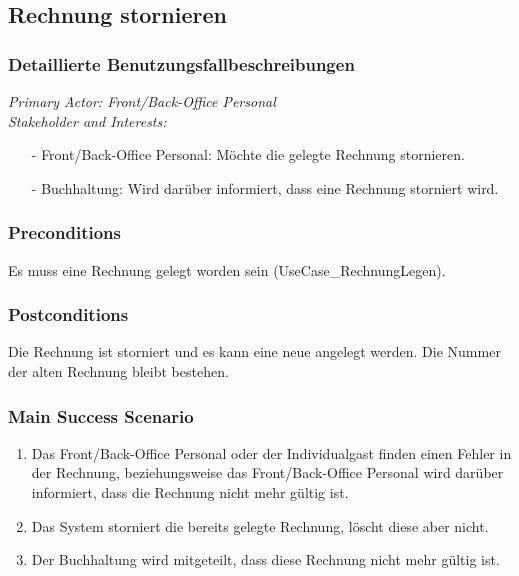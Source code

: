 \documentclass[./detailed_overview_usecases.tex]{subfiles}
\begin{document}
    \subsection{Rechnung stornieren}
    \subsubsection{Detaillierte Benutzungsfallbeschreibungen}
    \textit{Primary Actor: Front/Back-Office Personal}
    \\
    \textit{Stakeholder and Interests:}
    \begin{itemize}
        \item[-] Front/Back-Office Personal: Möchte die gelegte Rechnung stornieren.
        \item[-] Buchhaltung: Wird darüber informiert, dass eine Rechnung storniert wird.
    \end{itemize}

    \subsubsection*{Preconditions}
    Es muss eine Rechnung gelegt worden sein (UseCase_RechnungLegen).

    \subsubsection*{Postconditions}
    Die Rechnung ist storniert und es kann eine neue angelegt werden. Die Nummer der alten Rechnung bleibt bestehen.

    \subsubsection*{Main Success Scenario}
    \begin{enumerate}
        \item Das Front/Back-Office Personal oder der Individualgast finden einen Fehler in der Rechnung, beziehungsweise das Front/Back-Office Personal wird darüber informiert, dass die Rechnung nicht mehr gültig ist.
        \item Das System storniert die bereits gelegte Rechnung, löscht diese aber nicht.
        \item Der Buchhaltung wird mitgeteilt, dass diese Rechnung nicht mehr gültig ist.
    \end{enumerate}
\end{document}
